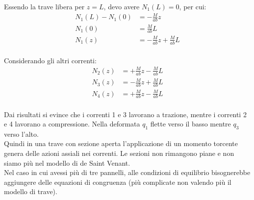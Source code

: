 Essendo la trave libera per $z=L$, devo avere $N_1(L) = 0$, per cui:
\begin{align*}
    N_1(L) - N_1(0)  &=-\frac{M}{ab}z\\
    N_1(0) &= \frac{M}{ab}L\\
     N_1(z) &= -\frac{M}{ab}z+\frac{M}{ab}L \\
\end{align*}

Considerando gli altri correnti:
\begin{align*}
     N_2(z) &= +\frac{M}{ab}z-\frac{M}{ab}L \\
      N_3(z) &= -\frac{M}{ab}z+\frac{M}{ab}L \\
       N_4(z) &= +\frac{M}{ab}z-\frac{M}{ab}L \\
\end{align*}

Dai risultati si evince che i correnti 1 e 3 lavorano a trazione, mentre i correnti 2 e 4 lavorano a compressione. Nella deformata $q_1$ flette verso il basso mentre $q_3$ verso l'alto.\\
Quindi in una trave con sezione aperta l'applicazione di un momento torcente genera delle azioni assiali nei correnti. Le sezioni non rimangono piane e non siamo più nel modello di de Saint Venant.\\

Nel caso in cui avessi più di tre pannelli, alle condizioni di equilibrio bisognerebbe aggiungere delle equazioni di congruenza (più complicate non valendo più il modello di trave).